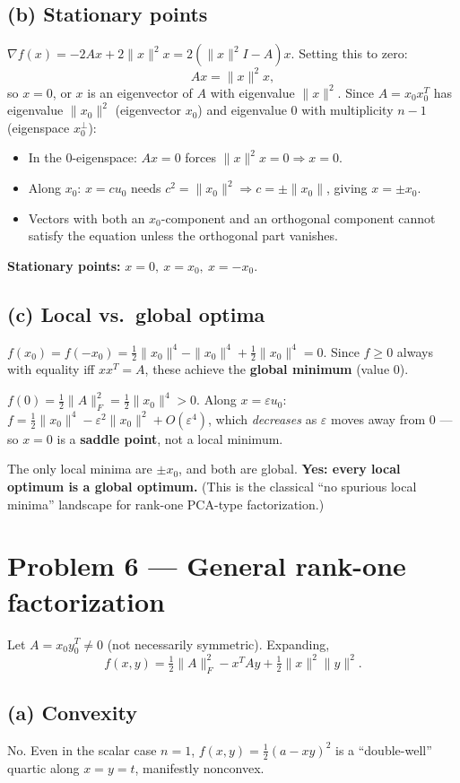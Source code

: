 \documentclass[11pt]{article}
\begin{document}
\subsection*{(b) Stationary points}
$\nabla f(x) = -2Ax+2\|x\|^2x = 2(\|x\|^2I - A)x$. Setting this to zero:
\[
Ax = \|x\|^2 x,
\]
so $x=0$, or $x$ is an eigenvector of $A$ with eigenvalue $\|x\|^2$. Since $A=x_0x_0^T$ has eigenvalue $\|x_0\|^2$ (eigenvector $x_0$) and eigenvalue $0$ with multiplicity $n-1$ (eigenspace $x_0^\perp$):
\begin{itemize}[leftmargin=1.5em]
\item In the $0$-eigenspace: $Ax=0$ forces $\|x\|^2x=0\Rightarrow x=0$.
\item Along $x_0$: $x=cu_0$ needs $c^2=\|x_0\|^2\Rightarrow c=\pm\|x_0\|$, giving $x=\pm x_0$.
\item Vectors with both an $x_0$-component and an orthogonal component cannot satisfy the equation unless the orthogonal part vanishes.
\end{itemize}
\textbf{Stationary points:} $x=0,\ x=x_0,\ x=-x_0$.

\subsection*{(c) Local vs.\ global optima}
$f(x_0)=f(-x_0)=\tfrac12\|x_0\|^4-\|x_0\|^4+\tfrac12\|x_0\|^4=0$. Since $f\ge0$ always with equality iff $xx^T=A$, these achieve the \textbf{global minimum} (value $0$).

$f(0)=\tfrac12\|A\|_F^2=\tfrac12\|x_0\|^4>0$. Along $x=\varepsilon u_0$: $f=\tfrac12\|x_0\|^4-\varepsilon^2\|x_0\|^2+O(\varepsilon^4)$, which \emph{decreases} as $\varepsilon$ moves away from $0$ --- so $x=0$ is a \textbf{saddle point}, not a local minimum.

The only local minima are $\pm x_0$, and both are global. \textbf{Yes: every local optimum is a global optimum.} (This is the classical ``no spurious local minima'' landscape for rank-one PCA-type factorization.)

\section*{Problem 6 --- General rank-one factorization}

Let $A=x_0y_0^T\ne0$ (not necessarily symmetric). Expanding,
\[
f(x,y) = \tfrac12\|A\|_F^2 - x^TAy + \tfrac12\|x\|^2\|y\|^2.
\]

\subsection*{(a) Convexity}
No. Even in the scalar case $n=1$, $f(x,y)=\tfrac12(a-xy)^2$ is a ``double-well'' quartic along $x=y=t$, manifestly nonconvex.
\end{document}
